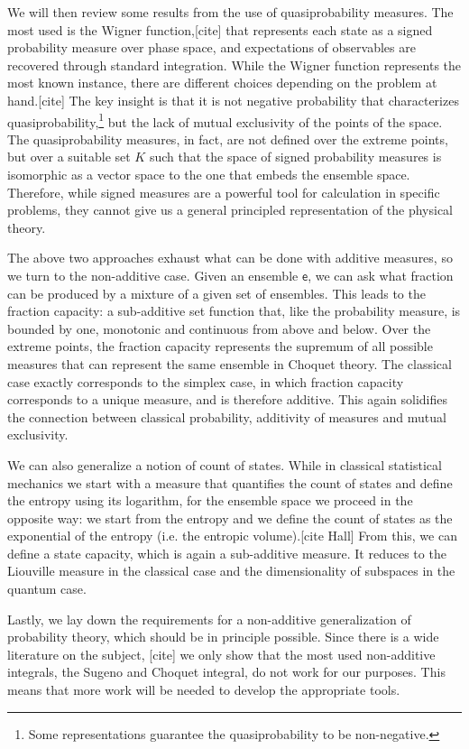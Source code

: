 \documentclass[10pt,twocolumn, nofootinbib]{revtex4-2}
\newcommand{\ens}[1][e] {\mathsf{#1}} %
\begin{document}
We will then review some results from the use of quasiprobability measures. The most used is the Wigner function,[cite] that represents each state as a signed probability measure over phase space, and expectations of observables are recovered through standard integration. While the Wigner function represents the most known instance, there are different choices depending on the problem at hand.[cite] The key insight is that it is not negative probability that characterizes quasiprobability,\footnote{Some representations guarantee the quasiprobability to be non-negative.} but the lack of mutual exclusivity of the points of the space. The quasiprobability measures, in fact, are not defined over the extreme points, but over a suitable set $K$ such that the space of signed probability measures is isomorphic as a vector space to the one that embeds the ensemble space. Therefore, while signed measures are a powerful tool for calculation in specific problems, they cannot give us a general principled representation of the physical theory.

The above two approaches exhaust what can be done with additive measures, so we turn to the non-additive case. Given an ensemble $\ens$, we can ask what fraction can be produced by a mixture of a given set of ensembles. This leads to the fraction capacity: a sub-additive set function that, like the probability measure, is bounded by one, monotonic and continuous from above and below. Over the extreme points, the fraction capacity represents the supremum of all possible measures that can represent the same ensemble in Choquet theory. The classical case exactly corresponds to the simplex case, in which fraction capacity corresponds to a unique measure, and is therefore additive. This again solidifies the connection between classical probability, additivity of measures and mutual exclusivity.

We can also generalize a notion of count of states. While in classical statistical mechanics we start with a measure that quantifies the count of states and define the entropy using its logarithm, for the ensemble space we proceed in the opposite way: we start from the entropy and we define the count of states as the exponential of the entropy (i.e. the entropic volume).[cite Hall] From this, we can define a state capacity, which is again a sub-additive measure. It reduces to the Liouville measure in the classical case and the dimensionality of subspaces in the quantum case.

Lastly, we lay down the requirements for a non-additive generalization of probability theory, which should be in principle possible. Since there is a wide literature on the subject, [cite] we only show that the most used non-additive integrals, the Sugeno and Choquet integral, do not work for our purposes. This means that more work will be needed to develop the appropriate tools.
\end{document}
